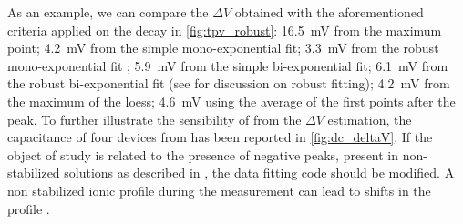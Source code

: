 	As an example, we can compare the $\Delta V$ obtained with the aforementioned criteria applied on the  decay in \cref{fig:tpv_robust}: \SI{16.5}{\mV} from the maximum point; \SI{4.2}{\mV} from the simple mono-exponential fit; \SI{3.3}{\mV} from the robust mono-exponential fit ; \SI{5.9}{\mV} from the simple bi-exponential fit; \SI{6.1}{\mV} from the robust bi-exponential fit (see  for discussion on robust fitting); \SI{4.2}{\mV} from the maximum of the \gls{loess}; \SI{4.6}{\mV} using the average of the first points after the peak.
	To further illustrate the sensibility of  from the $\Delta V$ estimation, the capacitance of four devices from \cite{Gelmetti2019} has been reported in \cref{fig:dc_deltaV}.
	If the object of study is related to the presence of negative peaks, present in non-stabilized solutions as described in , the data fitting code should be modified.
	A non stabilized ionic profile during the  measurement can lead to shifts in the  profile \cite{ORegan2015b}.
	
